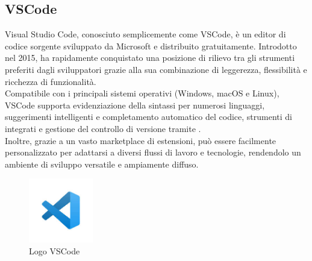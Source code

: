 \subsection{VSCode}
\noindent Visual Studio Code, conosciuto semplicemente come VSCode, è un editor di codice sorgente sviluppato da Microsoft e distribuito gratuitamente. Introdotto nel 2015, ha rapidamente conquistato una posizione di rilievo tra gli strumenti preferiti dagli sviluppatori grazie alla sua combinazione di leggerezza, flessibilità e ricchezza di funzionalità. \\Compatibile con i principali sistemi operativi (Windows, macOS e Linux), VSCode supporta evidenziazione della sintassi per numerosi linguaggi, suggerimenti intelligenti e completamento automatico del codice, strumenti di  integrati e gestione del controllo di versione tramite . \\Inoltre, grazie a un vasto marketplace di estensioni, può essere facilmente personalizzato per adattarsi a diversi flussi di lavoro e tecnologie, rendendolo un ambiente di sviluppo versatile e ampiamente diffuso.
\begin{figure}[H]
    \centering
    \includegraphics[width=0.25\textwidth]{img/vscode.jpg}
    \caption[Logo VSCode]{Logo VSCode}
\end{figure}

\newpage